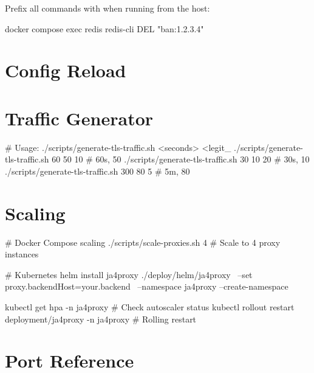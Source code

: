 Prefix all commands with  when running from the host:
\begin{bashcode}
docker compose exec redis redis-cli DEL "ban:1.2.3.4"
\end{bashcode}

\section{Config Reload}


\section{Traffic Generator}

\begin{bashcode}
# Usage: ./scripts/generate-tls-traffic.sh <seconds> <legit_%
./scripts/generate-tls-traffic.sh 60 50 10   # 60s, 50%
./scripts/generate-tls-traffic.sh 30 10 20   # 30s, 10%
./scripts/generate-tls-traffic.sh 300 80 5   # 5m, 80%
\end{bashcode}

\section{Scaling}

\begin{bashcode}
# Docker Compose scaling
./scripts/scale-proxies.sh 4   # Scale to 4 proxy instances

# Kubernetes
helm install ja4proxy ./deploy/helm/ja4proxy \
  --set proxy.backendHost=your.backend \
  --namespace ja4proxy --create-namespace

kubectl get hpa -n ja4proxy    # Check autoscaler status
kubectl rollout restart deployment/ja4proxy -n ja4proxy  # Rolling restart
\end{bashcode}

\section{Port Reference}


